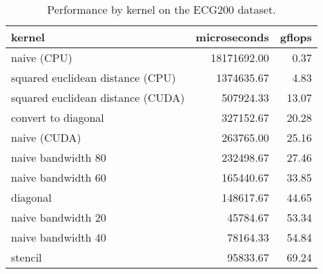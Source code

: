 \begin{table}[htbp]
\centering
\caption{Performance by kernel on the ECG200 dataset.}
\label{ecg_table}
\begin{tabular}{lrr}
\toprule
                           kernel &  microseconds &  gflops \\
\midrule
                      naive (CPU) &   18171692.00 &    0.37 \\
 squared euclidean distance (CPU) &    1374635.67 &    4.83 \\
squared euclidean distance (CUDA) &     507924.33 &   13.07 \\
              convert to diagonal &     327152.67 &   20.28 \\
                     naive (CUDA) &     263765.00 &   25.16 \\
               naive bandwidth 80 &     232498.67 &   27.46 \\
               naive bandwidth 60 &     165440.67 &   33.85 \\
                         diagonal &     148617.67 &   44.65 \\
               naive bandwidth 20 &      45784.67 &   53.34 \\
               naive bandwidth 40 &      78164.33 &   54.84 \\
                          stencil &      95833.67 &   69.24 \\
\bottomrule
\end{tabular}
\end{table}
